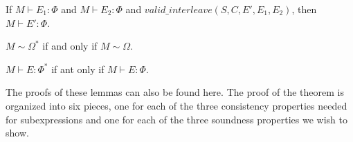 \begin{lem}
\label{lemma:effsound:effects2}
If $M \vdash E_1 : \Phi$ and $M \vdash E_2 : \Phi$ and $valid\_interleave(S, C, E', E_1, E_2)$, then $M \vdash E' : \Phi$.
\end{lem}

\begin{lem}
\label{lemma:omegaclosure}
$M \sim \Omega^*$ if and only if $M \sim \Omega$.
\end{lem}

\begin{lem}
\label{lemma:phiclosure}
$M \vdash E : \Phi^*$ if ant only if $M \vdash E : \Phi$.
\end{lem}

The proofs of these lemmas can also be found here\cite{xyz}.  The proof of the theorem is organized
into six pieces, one for each of the three consistency properties needed for subexpressions and one
for each of the three soundness properties we wish to show.

